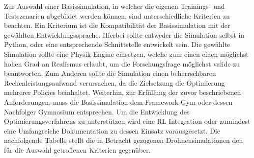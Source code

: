 Zur Auswahl einer Basissimulation, in welcher die eigenen Trainings- und Testszenarien abgebildet werden können, sind unterschiedliche Kriterien zu beachten.
Ein Kriterium ist die Kompatibilität der Basissimulation mit der gewählten Entwicklungssprache. 
Hierbei sollte entweder die Simulation selbst in Python, oder eine entsprechende Schnittstelle entwickelt sein.
Die gewählte Simulation sollte eine Physik-Engine einsetzen, welche zum einen einen möglichst hohen Grad an Realismus erlaubt, um die Forschungsfrage möglichst valide zu beantworten.
Zum Anderen sollte die Simulation einen beherrschbaren Rechenleistungsaufwand verursachen, da die Zielsetzung die Optimierung mehrerer Policies beinhaltet.
Weiterhin, zur Erfüllung der zuvor beschriebenen Anforderungen, muss die Basissimulation dem Framework Gym oder dessen Nachfolger Gymnasium entsprechen.
Um die Entwicklung des Optimierungsverfahrens zu unterstützen wird eine RL Integration oder zumindest eine Umfangreiche Dokumentation zu dessen Einsatz vorausgesetzt.
Die nachfolgende Tabelle stellt die in Betracht gezogenen Drohnensimulationen den für die Auswahl getroffenen Kriterien gegenüber.

